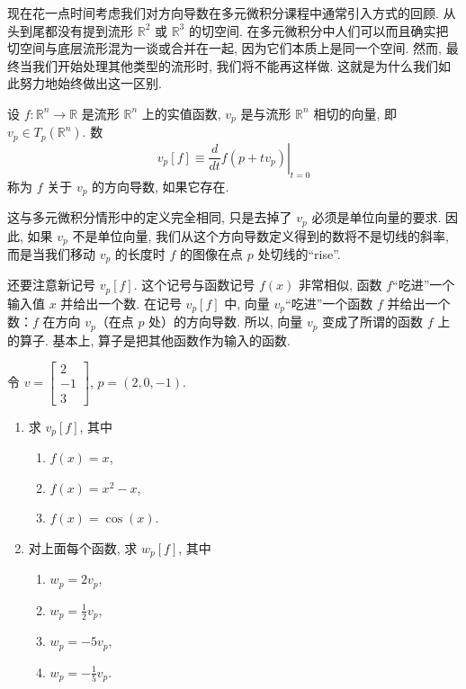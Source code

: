 现在花一点时间考虑我们对方向导数在多元微积分课程中通常引入方式的回顾. 从头到尾都没有提到流形 $\mathbb{R}^2$ 或 $\mathbb{R}^3$ 的切空间. 在多元微积分中人们可以而且确实把切空间与底层流形混为一谈或合并在一起, 因为它们本质上是同一个空间. 然而, 最终当我们开始处理其他类型的流形时, 我们将不能再这样做. 这就是为什么我们如此努力地始终做出这一区别.

\begin{definition}\label{def:2-3-3}
设 $f:\mathbb{R}^n\to\mathbb{R}$ 是流形 $\mathbb{R}^n$ 上的实值函数, $v_p$ 是与流形 $\mathbb{R}^n$ 相切的向量, 即 $v_p\in T_p(\mathbb{R}^n)$. 数
\[
v_p[f]\equiv\left.\frac{d}{dt}f(p+tv_p)\right|_{t=0}
\]
称为 $f$ 关于 $v_p$ 的方向导数, 如果它存在.
\end{definition}

这与多元微积分情形中的定义完全相同, 只是去掉了 $v_p$ 必须是单位向量的要求. 因此, 如果 $v_p$ 不是单位向量, 我们从这个方向导数定义得到的数将不是切线的斜率, 而是当我们移动 $v_p$ 的长度时 $f$ 的图像在点 $p$ 处切线的``rise''.

还要注意新记号 $v_p[f]$. 这个记号与函数记号 $f(x)$ 非常相似, 函数 $f$``吃进''一个输入值 $x$ 并给出一个数. 在记号 $v_p[f]$ 中, 向量 $v_p$``吃进''一个函数 $f$ 并给出一个数：$f$ 在方向 $v_p$（在点 $p$ 处）的方向导数. 所以, 向量 $v_p$ 变成了所谓的函数 $f$ 上的算子. 基本上, 算子是把其他函数作为输入的函数.

\begin{question}\label{q:2-4}
令 $v=\begin{bmatrix}2\\-1\\3\end{bmatrix}$, $p=(2,0,-1)$.
\begin{enumerate}
  \item[(a)] 求 $v_p[f]$, 其中
  \begin{enumerate}
    \item[(i)] $f(x)=x$, 
    \item[(ii)] $f(x)=x^2-x$, 
    \item[(iii)] $f(x)=\cos(x)$.
  \end{enumerate}
  \item[(b)] 对上面每个函数, 求 $w_p[f]$, 其中
  \begin{enumerate}
    \item[(i)] $w_p=2v_p$, 
    \item[(ii)] $w_p=\frac12v_p$, 
    \item[(iii)] $w_p=-5v_p$, 
    \item[(iv)] $w_p=-\frac15v_p$.
  \end{enumerate}
\end{enumerate}
\end{question}

